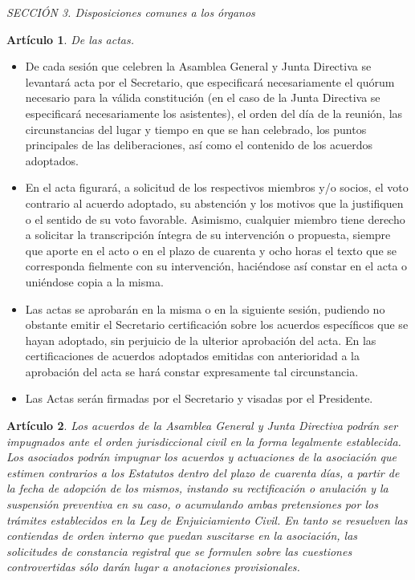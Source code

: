 \documentclass[a4paper,12pt]{article}
\theoremstyle{mystyle}		%
\newtheorem{art}{Artículo}	%
\begin{document}
\begin{onehalfspace}
\bigskip

\textit{SECCIÓN 3\textordfeminine. Disposiciones comunes a los órganos}

\begin{art}
De las actas.
\end{art}
\begin{itemize}
\item [1.-] De cada sesión que celebren la Asamblea General y Junta Directiva   se   levantará    acta   por el Secretario,  que  especificará necesariamente el quórum necesario para la válida constitución (en el caso de la Junta Directiva se especificará necesariamente los asistentes), el orden del día de la reunión, las circunstancias del lugar y tiempo en que se han celebrado, los puntos principales de las deliberaciones, así como el contenido de los acuerdos adoptados.
\item [2.-] En el acta figurará, a solicitud de los respectivos miembros y/o socios, el voto contrario al acuerdo adoptado, su abstención y los motivos que la justifiquen o el sentido de su voto favorable. Asimismo, cualquier miembro tiene derecho a solicitar la transcripción íntegra de su intervención o propuesta, siempre que aporte en el acto o en el plazo de cuarenta y ocho horas el texto que se corresponda fielmente con su intervención, haciéndose así constar en el acta o uniéndose copia a la misma.
\item [3.-] Las actas se aprobarán en la misma o en la siguiente sesión, pudiendo no obstante emitir el Secretario certificación sobre los acuerdos específicos que se hayan adoptado, sin perjuicio de la ulterior aprobación del acta. En las certificaciones de acuerdos adoptados emitidas con anterioridad a la aprobación del acta se hará constar expresamente tal circunstancia.
\item [4.-] Las Actas serán firmadas por el Secretario y visadas por el Presidente.
\end{itemize}

\begin{art}
Los acuerdos de la Asamblea General y Junta Directiva podrán ser impugnados ante el orden jurisdiccional civil en la forma legalmente establecida. Los asociados podrán impugnar los acuerdos y actuaciones de la asociación que estimen contrarios a los Estatutos dentro del plazo de cuarenta días, a partir de la fecha de adopción de los mismos, instando su rectificación o anulación y la suspensión preventiva en su caso, o acumulando ambas pretensiones por los trámites establecidos en la Ley de Enjuiciamiento Civil. En tanto se resuelven las contiendas de orden interno que puedan suscitarse en la asociación, las solicitudes de constancia registral que se formulen sobre las cuestiones controvertidas sólo darán lugar a anotaciones provisionales.
\end{art}


\end{onehalfspace}
\end{document}
